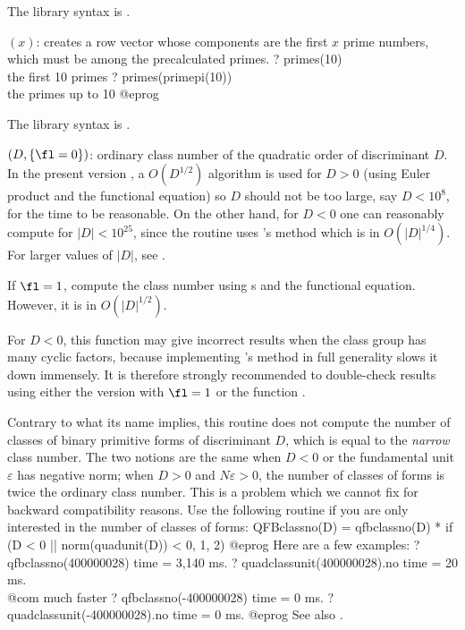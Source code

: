 The library syntax is .

$(x)$: \label{se:primes}creates a row vector whose components
are the first $x$ prime numbers, which must be among the precalculated primes.
\bprog
? primes(10)           \\ the first 10 primes
? primes(primepi(10))  \\ the primes up to 10
@eprog

The library syntax is .

$(D,\{\fl=0\})$: \label{se:qfbclassno}ordinary class number of the quadratic
order of discriminant $D$. In the present version \vers, a $O(D^{1/2})$
algorithm is used for $D > 0$ (using Euler product and the functional
equation) so $D$ should not be too large, say $D < 10^8$, for the time to be
reasonable. On the other hand, for $D < 0$ one can reasonably compute
 for $|D|<10^{25}$, since the routine uses
's method which is in $O(|D|^{1/4})$. For larger values of $|D|$,
see .

If $\fl=1$, compute the class number using s and the
functional equation. However, it is in $O(|D|^{1/2})$.

 For $D < 0$, this function may give incorrect
results when the class group has many cyclic factors,
because implementing 's method in full generality slows it down
immensely. It is therefore strongly recommended to double-check results using
either the version with $\fl = 1$ or the function .

 Contrary to what its name implies, this routine does not
compute the number of classes of binary primitive forms of discriminant $D$,
which is equal to the \emph{narrow} class number. The two notions are the same
when $D < 0$ or the fundamental unit $\varepsilon$ has negative norm; when $D
> 0$ and $N\varepsilon > 0$, the number of classes of forms is twice the
ordinary class number. This is a problem which we cannot fix for backward
compatibility reasons. Use the following routine if you are only interested
in the number of classes of forms:
\bprog
QFBclassno(D) =
qfbclassno(D) * if (D < 0 || norm(quadunit(D)) < 0, 1, 2)
@eprog\noindent
Here are a few examples:
\bprog
? qfbclassno(400000028)
time = 3,140 ms.
? quadclassunit(400000028).no
time = 20 ms. \\@com{ much faster}
? qfbclassno(-400000028)
time = 0 ms.
? quadclassunit(-400000028).no
time = 0 ms.
@eprog\noindent
See also .

